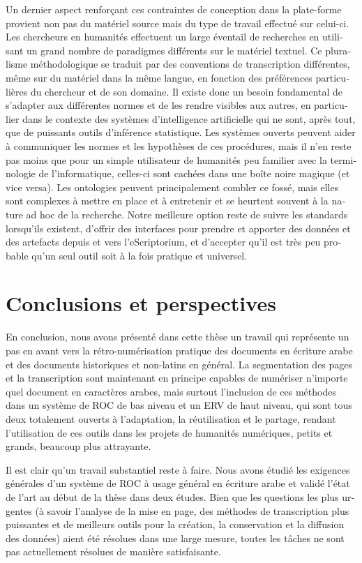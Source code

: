 \begin{french}
Un dernier aspect renforçant ces contraintes de conception dans la plate-forme
provient non pas du matériel source mais du type de travail effectué sur
celui-ci. Les chercheurs en humanités effectuent un large éventail de
recherches en utilisant un grand nombre de paradigmes différents sur le
matériel textuel. Ce pluralisme méthodologique se traduit par des conventions
de transcription différentes, même sur du matériel dans la même langue, en
fonction des préférences particulières du chercheur et de son domaine. Il
existe donc un besoin fondamental de s'adapter aux différentes normes et de les
rendre visibles aux autres, en particulier dans le contexte des systèmes
d'intelligence artificielle qui ne sont, après tout, que de puissants outils
d'inférence statistique. Les systèmes ouverts peuvent aider à communiquer les
normes et les hypothèses de ces procédures, mais il n'en reste pas moins que
pour un simple utilisateur de humanités peu familier avec la
terminologie de l'informatique, celles-ci sont cachées dans une boîte noire
magique (et vice versa). Les ontologies peuvent principalement combler ce
fossé, mais elles sont complexes à mettre en place et à entretenir et se
heurtent souvent à la nature ad hoc de la recherche. Notre meilleure option
reste de suivre les standards lorsqu'ils existent, d'offrir des interfaces pour
prendre et apporter des données et des artefacts depuis et vers l'eScriptorium,
et d'accepter qu'il est très peu probable qu'un seul outil soit à la fois
pratique et universel.

\section{Conclusions et perspectives}

En conclusion, nous avons présenté dans cette thèse un travail qui représente
un pas en avant vers la rétro-numérisation pratique des documents en écriture
arabe et des documents historiques et non-latins en général. La segmentation
des pages et la transcription sont maintenant en principe capables de numériser
n'importe quel document en caractères arabes, mais surtout l'inclusion de ces
méthodes dans un système de ROC de bas niveau et un ERV de haut niveau, qui
sont tous deux totalement ouverts à l'adaptation, la réutilisation et le
partage, rendant l'utilisation de ces outils dans les projets de humanités numériques, petits et grands, beaucoup plus attrayante.

Il est clair qu'un travail substantiel reste à faire. Nous avons étudié les
exigences générales d'un système de ROC à usage général en écriture arabe et
validé l'état de l'art au début de la thèse dans deux études. Bien que les
questions les plus urgentes (à savoir l'analyse de la mise en page, des méthodes de
transcription plus puissantes et de meilleurs outils pour la création, la
conservation et la diffusion des données) aient été résolues dans une large
mesure, toutes les tâches ne sont pas actuellement résolues de manière
satisfaisante.


\end{french}

